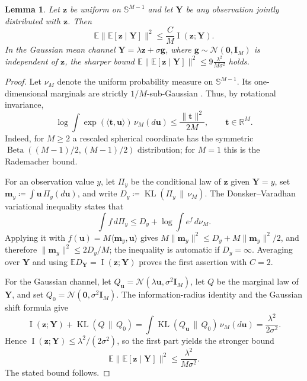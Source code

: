 \documentclass[11pt]{article}
\newtheorem{lemma}{Lemma}
\newcommand{\E}{\mathbb{E}}
\begin{document}
\begin{lemma}
\label{lem:spherical-posterior}
Let $\bm z$ be uniform on $\mathbb S^{M-1}$ and let $\bm Y$ be any
observation jointly distributed with $\bm z$. Then
\[
  \E\bigl\|\E[\bm z\mid\bm Y]\bigr\|^2
  \le
  \frac{C}{M}\operatorname{I}(\bm z;\bm Y).
\]
In the Gaussian mean channel
$\bm Y=\lambda\bm z+\sigma\bm g$, where
$\bm g\sim\mathcal N(\bm 0,\bm I_M)$ is independent of $\bm z$, the sharper
bound
$\E\bigl\|\E[\bm z\mid\bm Y]\bigr\|^2 \le 9\frac{\lambda^2}{M\sigma^2}$
holds.
\end{lemma}
\begin{proof}
Let $\nu_M$ denote the uniform probability measure on
$\mathbb S^{M-1}$. Its one-dimensional marginals are strictly
$1/M$-sub-Gaussian \cite[Corollary~1]{marchal2017subgaussian}. Thus, by
rotational invariance,
\[
  \log\int \exp(\langle\bm t,\bm u\rangle)\,\nu_M(d\bm u)
  \le \frac{\|\bm t\|^2}{2M},
  \qquad \bm t\in\mathbb R^M.
\]
Indeed, for $M\ge2$ a rescaled spherical coordinate has the symmetric
$\operatorname{Beta}((M-1)/2,(M-1)/2)$ distribution; for $M=1$ this is
the Rademacher bound.

For an observation value $y$, let $\Pi_y$ be the conditional law of
$\bm z$ given $\bm Y=y$, set
$\bm m_y\coloneqq\int\bm u\,\Pi_y(d\bm u)$, and write
$D_y\coloneqq\operatorname{KL}(\Pi_y\,\|\,\nu_M)$. The
Donsker--Varadhan variational inequality states that
\[
  \int f\,d\Pi_y
  \le D_y+\log\int e^f\,d\nu_M.
\]
Applying it with $f(\bm u)=M\langle\bm m_y,\bm u\rangle$ gives
$M\|\bm m_y\|^2\le D_y+M\|\bm m_y\|^2/2$, and therefore
$\|\bm m_y\|^2\le2D_y/M$; the inequality is automatic if $D_y=\infty$.
Averaging over $\bm Y$ and using
$\E D_{\bm Y}=\operatorname{I}(\bm z;\bm Y)$ proves the first assertion
with $C=2$.

For the Gaussian channel, let
$Q_{\bm u}=\mathcal N(\lambda\bm u,\sigma^2\bm I_M)$, let $Q$ be the
marginal law of $\bm Y$, and set
$Q_0=\mathcal N(\bm 0,\sigma^2\bm I_M)$. The information-radius identity
and the Gaussian shift formula give
\[
  \operatorname{I}(\bm z;\bm Y)+\operatorname{KL}(Q\,\|\,Q_0)
  =\int\operatorname{KL}(Q_{\bm u}\,\|\,Q_0)\,\nu_M(d\bm u)
  =\frac{\lambda^2}{2\sigma^2}.
\]
Hence $\operatorname{I}(\bm z;\bm Y)\le\lambda^2/(2\sigma^2)$, so the
first part yields the stronger bound
\[
  \E\bigl\|\E[\bm z\mid\bm Y]\bigr\|^2
  \le \frac{\lambda^2}{M\sigma^2}.
\]
The stated bound follows.
\end{proof}


\newpage 
\end{document}
